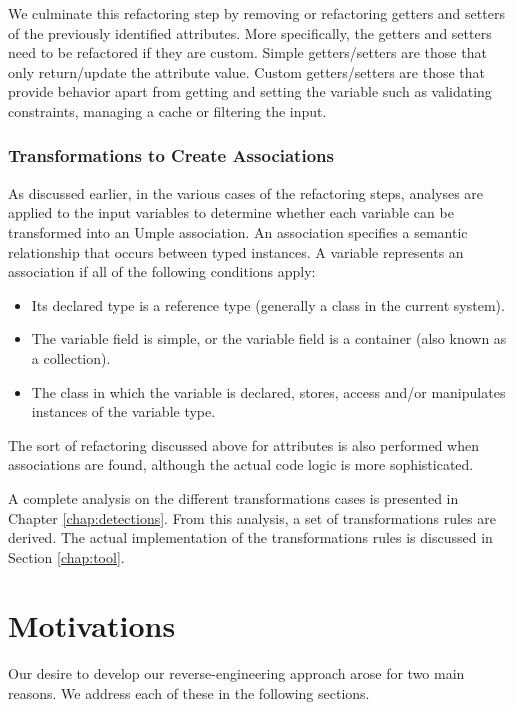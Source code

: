 We culminate this refactoring step by removing or refactoring getters and setters of the previously identified attributes. More specifically, the getters and setters need to be refactored if they are custom. Simple getters/setters are those that only return/update the attribute value.  Custom getters/setters are those that provide behavior apart from getting and setting the variable such as validating constraints, managing a cache or filtering the input.

\subsubsection{Transformations to Create Associations}

As discussed earlier, in the various cases of the refactoring steps, analyses are applied to the input variables to determine whether each variable can be transformed into an Umple association. An association specifies a semantic relationship that occurs between typed instances. A variable represents an association if all of the following conditions apply:

\begin{itemize}
\item Its declared type is a reference type (generally a class in the current system).
\item The variable field is simple, or the variable field is a container (also known as a collection).
\item The class in which the variable is declared, stores, access and/or manipulates instances of the variable type.

\end{itemize}

The sort of refactoring discussed above for attributes is also performed when associations are found, although the actual code logic is more sophisticated.

A complete analysis on the different transformations cases is presented in Chapter \ref{chap:detections}. From this analysis, a set of transformations rules are derived. The actual implementation of the transformations rules is discussed in Section \ref{chap:tool}.

\section{Motivations}

Our desire to develop our reverse-engineering approach arose for two main reasons. We address each of these in the following sections.

